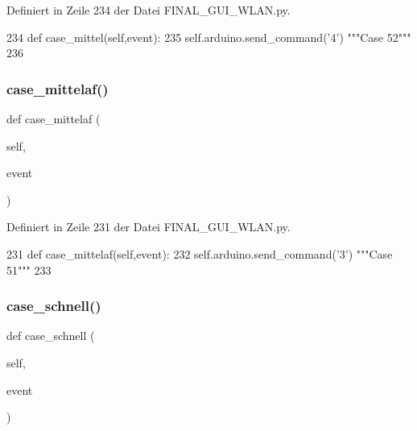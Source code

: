 Definiert in Zeile 234 der Datei F\+I\+N\+A\+L\+\_\+\+G\+U\+I\+\_\+\+W\+L\+A\+N.\+py.


\begin{DoxyCode}
234     \textcolor{keyword}{def }case\_mittel(self,event):
235         self.arduino.send\_command(\textcolor{stringliteral}{'4'})  \textcolor{stringliteral}{"""Case 52"""}
236  
\end{DoxyCode}
\mbox{\label{class_f_i_n_a_l___g_u_i___w_l_a_n_1_1_w_l_a_n_ae440f84a4fdfd4dd8b693ad84d8b85dd}} 
\subsubsection{\texorpdfstring{case\+\_\+mittelaf()}{case\_mittelaf()}}
{\footnotesize\ttfamily def case\+\_\+mittelaf (\begin{DoxyParamCaption}\item[{}]{self,  }\item[{}]{event }\end{DoxyParamCaption})}



Definiert in Zeile 231 der Datei F\+I\+N\+A\+L\+\_\+\+G\+U\+I\+\_\+\+W\+L\+A\+N.\+py.


\begin{DoxyCode}
231     \textcolor{keyword}{def }case\_mittelaf(self,event):
232         self.arduino.send\_command(\textcolor{stringliteral}{'3'})  \textcolor{stringliteral}{"""Case 51"""}
233     
\end{DoxyCode}
\mbox{\label{class_f_i_n_a_l___g_u_i___w_l_a_n_1_1_w_l_a_n_a4ca8c53320e0f6200653b0de263209f1}} 
\subsubsection{\texorpdfstring{case\+\_\+schnell()}{case\_schnell()}}
{\footnotesize\ttfamily def case\+\_\+schnell (\begin{DoxyParamCaption}\item[{}]{self,  }\item[{}]{event }\end{DoxyParamCaption})}



